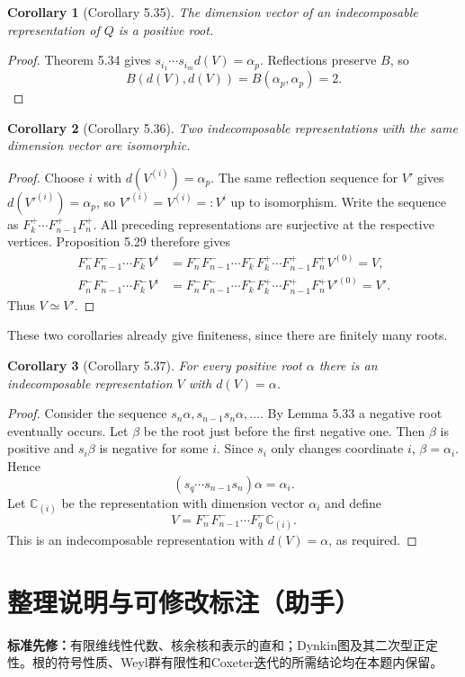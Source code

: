 \documentclass[UTF8,11pt,a4paper]{ctexart}
\newtheorem*{corollary}{Corollary}
\theoremstyle{definition}\newtheorem*{definition}{Definition}
\theoremstyle{remark}\newtheorem*{remark}{Remark}
\newcommand{\C}{\mathbb C}
\begin{document}
\begin{corollary}[Corollary 5.35]
The dimension vector of an indecomposable representation of $Q$ is a positive root.
\end{corollary}
\begin{proof}
Theorem 5.34 gives $s_{i_1}\cdots s_{i_m}d(V)=\alpha_p$. Reflections preserve $B$, so
\[
B(d(V),d(V))=B(\alpha_p,\alpha_p)=2.
\]
\end{proof}

\begin{corollary}[Corollary 5.36]
Two indecomposable representations with the same dimension vector are isomorphic.
\end{corollary}
\begin{proof}
Choose $i$ with $d(V^{(i)})=\alpha_p$. The same reflection sequence for $V'$ gives $d(V'^{(i)})=\alpha_p$, so $V'^{(i)}=V^{(i)}=:V^i$ up to isomorphism. Write the sequence as $F_k^+\cdots F_{n-1}^+F_n^+$. All preceding representations are surjective at the respective vertices. Proposition 5.29 therefore gives
\[
\begin{aligned}
F_n^-F_{n-1}^-\cdots F_k^-V^i
&=F_n^-F_{n-1}^-\cdots F_k^-F_k^+\cdots F_{n-1}^+F_n^+V^{(0)}=V,\\
F_n^-F_{n-1}^-\cdots F_k^-V^i
&=F_n^-F_{n-1}^-\cdots F_k^-F_k^+\cdots F_{n-1}^+F_n^+V'^{(0)}=V'.
\end{aligned}
\]
Thus $V\simeq V'$.
\end{proof}
These two corollaries already give finiteness, since there are finitely many roots.

\begin{corollary}[Corollary 5.37]
For every positive root $\alpha$ there is an indecomposable representation $V$ with $d(V)=\alpha$.
\end{corollary}
\begin{proof}
Consider the sequence $s_n\alpha,s_{n-1}s_n\alpha,\ldots$. By Lemma 5.33 a negative root eventually occurs. Let $\beta$ be the root just before the first negative one. Then $\beta$ is positive and $s_i\beta$ is negative for some $i$. Since $s_i$ only changes coordinate $i$, $\beta=\alpha_i$. Hence
\[
(s_q\cdots s_{n-1}s_n)\alpha=\alpha_i.
\]
Let $\C_{(i)}$ be the representation with dimension vector $\alpha_i$ and define
\[
V=F_n^-F_{n-1}^-\cdots F_q^-\C_{(i)}.
\]
This is an indecomposable representation with $d(V)=\alpha$, as required.
\end{proof}

\section*{整理说明与可修改标注（助手）}
\textbf{标准先修：}有限维线性代数、核余核和表示的直和；Dynkin图及其二次型正定性。根的符号性质、Weyl群有限性和Coxeter迭代的所需结论均在本题内保留。
\end{document}
